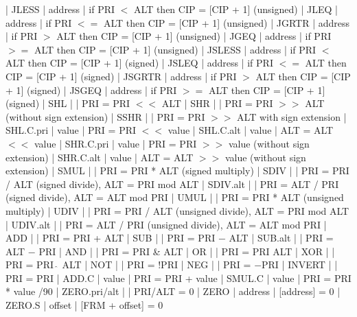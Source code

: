 {    | JLESS          | address | if PRI $<$ ALT then CIP = [CIP + 1] (unsigned) \nl
{}    | JLEQ           | address | if PRI $<=$ ALT then CIP = [CIP + 1] (unsigned) \nl
{}    | JGRTR          | address | if PRI $>$ ALT then CIP = [CIP + 1] (unsigned) \nl
{}    | JGEQ           | address | if PRI $>=$ ALT then CIP = [CIP + 1] (unsigned) \nl
{}    | JSLESS         | address | if PRI $<$ ALT then CIP = [CIP + 1] (signed) \nl
{}    | JSLEQ          | address | if PRI $<=$ ALT then CIP = [CIP + 1] (signed) \nl
{}    | JSGRTR         | address | if PRI $>$ ALT then CIP = [CIP + 1] (signed) \nl
{}    | JSGEQ          | address | if PRI $>=$ ALT then CIP = [CIP + 1] (signed) \nl
{}    | SHL            |         | PRI = PRI $<<$ ALT \nl
{}    | SHR            |         | PRI = PRI $>>$ ALT (without sign extension) \nl
{}    | SSHR           |         | PRI = PRI $>>$ ALT with sign extension \nl
{}    | SHL.C.pri      | value   | PRI = PRI $<<$ value \nl
{}    | SHL.C.alt      | value   | ALT = ALT $<<$ value \nl
{}    | SHR.C.pri      | value   | PRI = PRI $>>$ value (without sign extension) \nl
{}    | SHR.C.alt      | value   | ALT = ALT $>>$ value (without sign extension) \nl
{}    | SMUL           |         | PRI = PRI * ALT (signed multiply) \nl
{}    | SDIV           |         | PRI = PRI / ALT (signed divide), ALT = PRI mod ALT \nl
{}    | SDIV.alt       |         | PRI = ALT / PRI (signed divide), ALT = ALT mod PRI \nl
{}    | UMUL           |         | PRI = PRI * ALT (unsigned multiply) \nl
{}    | UDIV           |         | PRI = PRI / ALT (unsigned divide), ALT = PRI mod ALT \nl
{}    | UDIV.alt       |         | PRI = ALT / PRI (unsigned divide), ALT = ALT mod PRI \nl
{}    | ADD            |         | PRI = PRI + ALT \nl
{}    | SUB            |         | PRI = PRI $-$ ALT \nl
{}    | SUB.alt        |         | PRI = ALT $-$ PRI \nl
{}    | AND            |         | PRI = PRI \& ALT \nl
{}    | OR             |         | PRI = PRI \vbar ALT \nl
{}    | XOR            |         | PRI = PRI \hbox{$\hat{~}$} ALT \nl
{}    | NOT            |         | PRI = !PRI \nl
{}    | NEG            |         | PRI = $-$PRI \nl
{}    | INVERT         |         | PRI = \hbox{{\tt{}}}PRI \nl
{}    | ADD.C          | value   | PRI = PRI + value \nl
{}    | SMUL.C         | value   | PRI = PRI * value \nl
{}/90 | ZERO.pri/alt   |         | PRI/ALT = 0 \nl
{}    | ZERO           | address | [address] = 0 \nl
{}    | ZERO.S         | offset  | [FRM + offset] = 0 \nl
}
